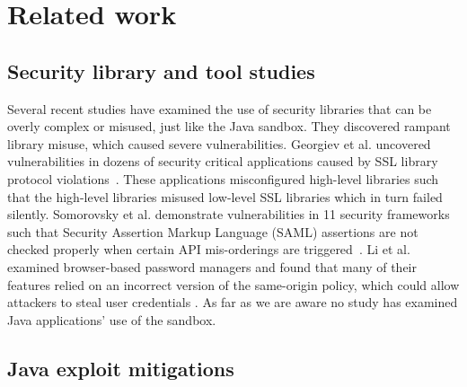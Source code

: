 \documentclass{sig-alternate}
\begin{document}
\section{Related work}
\label{sec:related}

\subsection{Security library and tool studies}

Several recent studies have examined the use of security libraries that can be overly complex or 
misused, just like the Java sandbox. They discovered rampant library misuse, which caused severe 
vulnerabilities.
Georgiev et al. uncovered vulnerabilities in dozens of security critical
applications caused by SSL library protocol violations~\cite{georgiev12most-dangerous}.
These applications misconfigured high-level libraries such that the
high-level libraries misused low-level SSL libraries which in turn
failed silently. Somorovsky et al. demonstrate vulnerabilities in
11 security frameworks such that Security Assertion Markup Language
(SAML) assertions are not checked properly when certain API mis-orderings
are triggered~\cite{somorovsky12breaking}. Li et al. examined browser-based
password managers and found that many of their features relied on
an incorrect version of the same-origin policy, which could allow
attackers to steal user credentials \cite{li2014emperor}. As far
as we are aware no study has examined Java applications' use of the
sandbox. 

\subsection{Java exploit mitigations}\label{sub:Related-Work-Mitigation}
\end{document}

